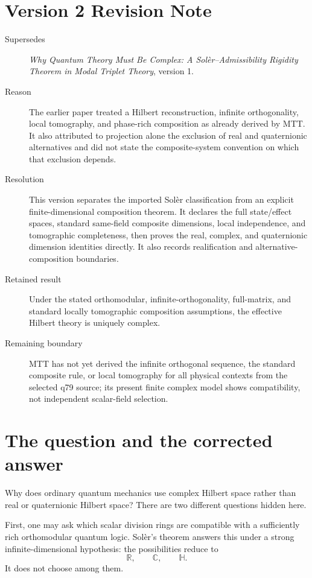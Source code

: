 \documentclass[11pt]{article}
\newcommand{\R}{\mathbb{R}}
\newcommand{\C}{\mathbb{C}}
\newcommand{\HH}{\mathbb{H}}
\begin{document}
\section*{Version 2 Revision Note}
\begin{description}
\item[Supersedes] \emph{Why Quantum Theory Must Be Complex: A
Sol\`er--Admissibility Rigidity Theorem in Modal Triplet Theory}, version 1.
\item[Reason] The earlier paper treated a Hilbert reconstruction, infinite
orthogonality, local tomography, and phase-rich composition as already derived
by MTT. It also attributed to projection alone the exclusion of real and
quaternionic alternatives and did not state the composite-system convention on
which that exclusion depends.
\item[Resolution] This version separates the imported Sol\`er classification
from an explicit finite-dimensional composition theorem. It declares the full
state/effect spaces, standard same-field composite dimensions, local
independence, and tomographic completeness, then proves the real, complex, and
quaternionic dimension identities directly. It also records realification and
alternative-composition boundaries.
\item[Retained result] Under the stated orthomodular, infinite-orthogonality,
full-matrix, and standard locally tomographic composition assumptions, the
effective Hilbert theory is uniquely complex.
\item[Remaining boundary] MTT has not yet derived the infinite orthogonal
sequence, the standard composite rule, or local tomography for all physical
contexts from the selected q79 source; its present finite complex model shows
compatibility, not independent scalar-field selection.
\end{description}

\tableofcontents

\section{The question and the corrected answer}

Why does ordinary quantum mechanics use complex Hilbert space rather than real or quaternionic Hilbert space? There are two different questions hidden here.

First, one may ask which scalar division rings are compatible with a sufficiently rich orthomodular quantum logic. Sol\`er's theorem answers this under a strong infinite-dimensional hypothesis: the possibilities reduce to
\[
\R,\qquad \C,\qquad \HH.
\]
It does not choose among them.
\end{document}
